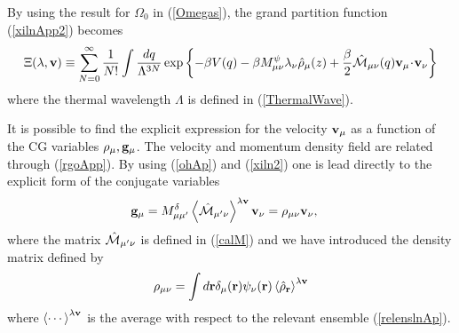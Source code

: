 \documentclass[b5paper,openright,10pt]{book}
\newcommand{\esc}{\!\cdot\!}
\newcommand{\llangle}{\left\langle}
\newcommand{\rrangle}{\right\rangle}
\begin{document}
\begin{appendices}
By using the result for $\Omega_0$ in (\ref{Omegas}),  the  grand  partition  function
(\ref{xilnApp2}) becomes
\begin{align}
\Xi(\lambda,{\bf v})\equiv \sum_{N=0}^\infty \frac{1}{N!}
\int \frac{dq}{\Lambda^{3N}}
\exp\left\{-\beta V(q)-\beta M^\psi_{\mu\nu}\lambda_\nu\hat{\rho}_{\mu}(z)+\frac{\beta}{2}\hat{\cal M}_{\mu\nu}(q){\bf v}_\mu \esc{\bf v}_\nu
\right\}
\label{xiln2b}
\end{align}
where the thermal wavelength $\Lambda$ is  defined in (\ref{ThermalWave}).



It is possible to find the  explicit expression for the velocity ${\bf
  v}_\mu$ as  a function of  the CG variables  $\rho_\mu,{\bf g}_\mu$.
The  velocity   and  momentum   density  field  are   related  through
(\ref{rgoApp}).   By  using  (\ref{ohAp})  and (\ref{xiln2})  one  is  lead
directly to the explicit form of the conjugate variables
\begin{align}
{\bf g}_\mu&=M^\delta_{\mu\mu'}\llangle \hat{\cal M}_{\mu'\nu}\rrangle^{\lambda {\bf v}} {\bf v}_\nu =\rho_{\mu\nu}{\bf v}_\nu,
\label{nu2}
\end{align}
where the  matrix $\hat{\cal M}_{\mu'\nu}$ is  defined in (\ref{calM})
and we have introduced the density matrix defined by
\begin{align}
  \rho_{\mu\nu} =\int d{\bf r}
\delta_\mu({\bf r})\psi_\nu({\bf r})\llangle\hat{\rho}_{\bf r}\rrangle^{\lambda{\bf v}}
\end{align}
where $\llangle\cdots\rrangle^{\lambda{\bf v}}$  is the average  with respect
to   the  relevant   ensemble   (\ref{relenslnAp}). 


\end{appendices}
\end{document}
